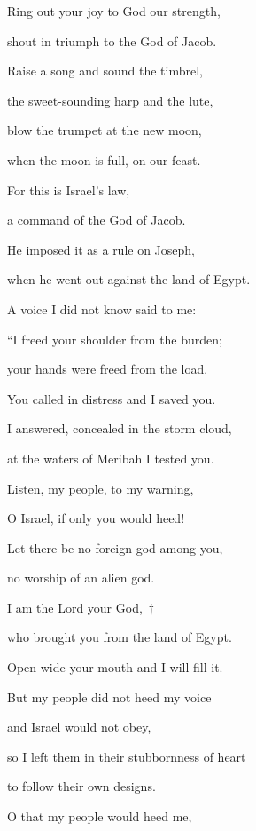 \noindent Ring out your joy to God our strength,~\GreStar{}~\nopagebreak

shout in triumph to the God of Jacob.

\noindent Raise a song and sound the timbrel,~\GreStar{}~\nopagebreak

the sweet-sounding harp and the lute,

\noindent blow the trumpet at the new moon,~\GreStar{}~\nopagebreak

when the moon is full, on our feast.

\noindent For this is Israel’s law,~\GreStar{}~\nopagebreak

a command of the God of Jacob.

\noindent He imposed it as a rule on Joseph,~\GreStar{}~\nopagebreak

when he went out against the land of Egypt.

\noindent A voice I did not know said to me:~\GreStar{}~\nopagebreak

“I freed your shoulder from the burden;

\noindent your hands were freed from the load.~\GreStar{}~\nopagebreak

You called in distress and I saved you.

\noindent I answered, concealed in the storm cloud,~\GreStar{}~\nopagebreak

at the waters of Meribah I tested you.

\noindent Listen, my people, to my warning,~\GreStar{}~\nopagebreak

O Israel, if only you would heed!

\noindent Let there be no foreign god among you,~\GreStar{}~\nopagebreak

no worship of an alien god.

\noindent I am the Lord your God,~†~\nopagebreak

who brought you from the land of Egypt.~\GreStar{}~\nopagebreak

Open wide your mouth and I will fill it.

\noindent But my people did not heed my voice~\GreStar{}~\nopagebreak

and Israel would not obey,

\noindent so I left them in their stubbornness of heart~\GreStar{}~\nopagebreak

to follow their own designs.

\noindent O that my people would heed me,~\GreStar{}~\nopagebreak

